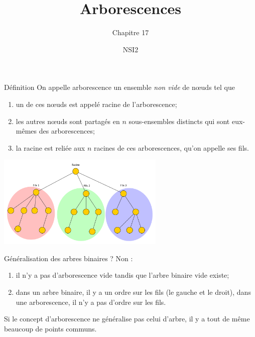 \documentclass[10pt]{beamer}
\title{Arborescences}
\subtitle{Chapitre 17}
\author{NSI2}
\begin{document}
\maketitle

\begin{frame}{Définition}
On appelle \alert{arborescence} un ensemble \textit{non vide} de n\oe uds tel que
\begin{enumerate}[--]
	\item 	un de ces n\oe uds est appelé \alert{racine} de l'arborescence;
	\item 	les autres n\oe uds sont partagés en $n$ sous-ensembles distincts qui sont eux-mêmes des arborescences;
    \item 	la racine est reliée aux $n$ racines de ces arborescences, qu'on appelle ses \alert{fils}.
\end{enumerate}
\begin{center}
\includegraphics[width=8cm]{img/arbo1}
\end{center}
\end{frame}
\begin{frame}{Généralisation des arbres binaires ?}
Non :
\begin{enumerate}[--]
	\item 	il n'y a pas d'arborescence vide tandis que l'arbre binaire vide existe;
    \item 	dans un arbre binaire, il y a un ordre sur les fils (le gauche et le droit), dans une arborescence, il n'y a pas d'ordre sur les fils.
\end{enumerate}
Si le concept d'arborescence ne généralise pas celui d'arbre, il y a tout de même beaucoup de points communs.
\end{frame}
\end{document}
